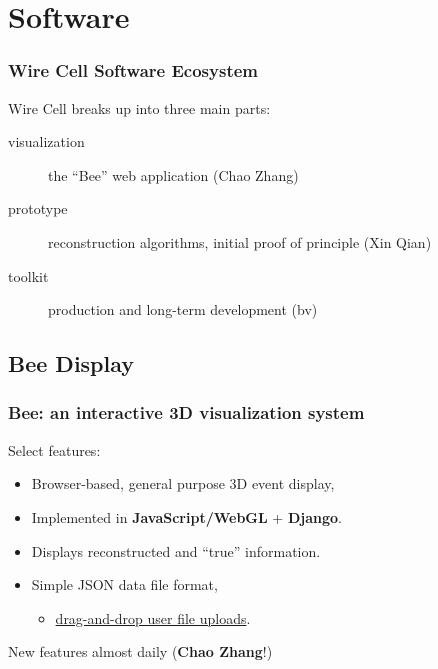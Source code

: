 \section{Software}

\begin{frame}
\end{frame}


\begin{frame}
  \frametitle{Wire Cell Software Ecosystem}

  Wire Cell breaks up into three main parts:

  \begin{description}
  \item[visualization] the ``Bee'' web application (Chao Zhang)
  \item[prototype] reconstruction algorithms, initial proof of
    principle (Xin Qian)
  \item[toolkit] production and long-term development (bv)
  \end{description}

\end{frame}

\subsection{Bee Display}

\begin{frame}
  \frametitle{Bee: an interactive 3D visualization system}

  Select features:
  \begin{itemize}
  \item Browser-based, general purpose 3D event display, 
  \item Implemented in \textbf{JavaScript/WebGL} + \textbf{Django}.
  \item Displays reconstructed and ``true'' information.
  \item Simple JSON data file format, 
    \begin{itemize}
    \item \href{http://bnlif.github.io/wire-cell-docs/viz/uploads/}{drag-and-drop user
      file uploads}.
    \end{itemize}
  \end{itemize}
  New features almost daily (\textbf{Chao Zhang}!)
\end{frame}

